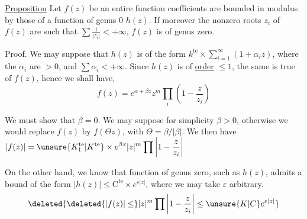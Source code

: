 
\uline{Proposition} \quad Let $f(z)$ be an entire function      coefficients are bounded in modulus by those of a function of genus $0$ $h(z)$. If moreover the nonzero roots $z_i$ of $f(z)$ are such that $\sum\frac{1}{|z_i|}<+\infty$, $f(z)$ is of genus zero.


Proof. We may suppose that $h(z)$ is of the form $k^{\mathrm{te}}\times\sum_{i=1}^{\infty}(1+\alpha_i z)$, where the $\alpha_i$ are $>0$, and $\sum\alpha_i<+\infty$. Since $h(z)$ is of \uline{order} $\leq1$, the same is true of $f(z)$, hence we shall have,
\[
f(z)=e^{\alpha+\beta z}z^m\prod_i\left(1-\frac{z}{z_i}\right)
\]

We must show that $\beta=0$. We may suppose for simplicity $\beta>0$, otherwise we would replace $f(z)$ by $f(\Theta z)$, with $\Theta=\beta/|\beta|$. We then have $\displaystyle |f(z)|=\unsure{K_1^{\mathrm{te}}|K^{\mathrm{te}}}\times e^{\beta x}|z|^m\prod\left|1-\frac{z}{z_i}\right|$

On the other hand, we know that   function of genus zero, such as $h(z)$, admits a bound of the form $|h(z)|\leq\mathrm C^{\mathrm{te}}\times e^{\varepsilon|z|}$, where we may take $\varepsilon$ arbitrary. 
\[
\deleted{\deleted{|f(z)|\leq}|z|^m\prod\left|1-\frac{z}{z_i}\right|\leq\unsure{K|C}e^{\varepsilon|z|}}
\]
